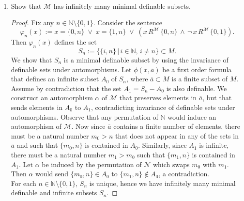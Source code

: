 \documentclass{article}
\begin{document}
\begin{enumerate}
\begin{enumerate}
\begin{enumerate}
          \item Show that $\mathcal{M}$ has infinitely many minimal
            definable subsets.
            \begin{proof}
              Fix any $n\in\mathbb{N}\setminus\{0,1\}$. Consider the
              sentence
              \begin{equation*}
                \varphi_n(x) := x=\{0,n\}\;\vee\; x=\{1,n\}\;\vee\;
                (x\,R^{\mathcal{M}}\, \{0,n\}\,\wedge\,
                \neg\,x\,R^{\mathcal{M}}\,\{0,1\}).
              \end{equation*}
              Then $\varphi_n(x)$ defines the set
              \begin{equation*}
                S_n := \{\{i,n\}\,|\, i\in\mathbb{N},\,i\neq n\}\subset M.
              \end{equation*}
              We show that $S_n$ is a minimal definable subset by using the
              invariance of definable sets under automorphisms. Let
              $\phi(x,\overline{a})$ be a first order formula that defines
              an infinite subset $A_0$ of $S_n$, where $\overline{a}\subset
              M$ is a finite subset of $M$. Assume by contradiction that
              the set $A_1=S_n-A_0$ is also definable. We construct an
              automorphism $\alpha$ of $\mathcal{M}$ that preserves
              elements in $\overline{a}$, but that sends elements in $A_0$ to
              $A_1$, contradicting invariance of definable sets
              under automorphisms. Observe that any permutation of
              $\mathbb{N}$ would induce an automorphism of $\mathcal{M}$.
              Now since $\overline{a}$ contains a finite number of
              elements, there must be a natural number $m_0>n$ that does
              not appear in any of the sets in $\overline{a}$ and such that
              $\{m_0,n\}$ is contained in $A_0$. Similarly, since $A_1$ is
              infinite, there must be a natural number $m_1>m_0$ such that
              $\{m_1,n\}$ is contained in $A_1$. Let $\alpha$ be induced by
              the permutation of $\mathcal{N}$ which swaps $m_0$ with
              $m_1$. Then $\alpha$ would send $\{m_0,n\}\in A_0$ to
              $\{m_1,n\}\not\in A_0$, a contradiction. \\

              For each $n\in\mathbb{N}\setminus\{0,1\}$, $S_n$ is unique,
              hence we have infinitely many minimal definable and infinite
              subsets $S_n$.
            \end{proof}
        \end{enumerate}
    \end{enumerate}
\end{enumerate}
\end{document}
